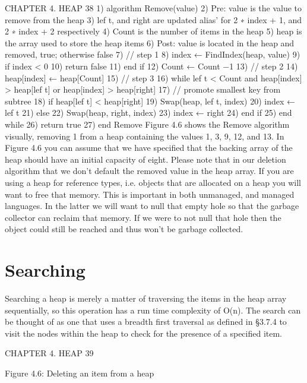 \documentclass{article}
\begin{document}
CHAPTER 4. HEAP 38
1) algorithm Remove(value)
2) Pre: value is the value to remove from the heap
3) lef t, and right are updated alias’ for 2 ∗ index + 1, and 2 ∗ index + 2 respectively
4) Count is the number of items in the heap
5) heap is the array used to store the heap items
6) Post: value is located in the heap and removed, true; otherwise false
7) // step 1
8) index ← FindIndex(heap, value)
9) if index < 0
10) return false
11) end if
12) Count ← Count −1
13) // step 2
14) heap[index] ← heap[Count]
15) // step 3
16) while lef t < Count and heap[index] > heap[lef t] or heap[index] > heap[right]
17) // promote smallest key from subtree
18) if heap[lef t] < heap[right]
19) Swap(heap, lef t, index)
20) index ← lef t
21) else
22) Swap(heap, right, index)
23) index ← right
24) end if
25) end while
26) return true
27) end Remove
Figure 4.6 shows the Remove algorithm visually, removing 1 from a heap
containing the values 1, 3, 9, 12, and 13. In Figure 4.6 you can assume that we
have specified that the backing array of the heap should have an initial capacity
of eight.
Please note that in our deletion algorithm that we don’t default the removed
value in the heap array. If you are using a heap for reference types, i.e. objects
that are allocated on a heap you will want to free that memory. This is important
in both unmanaged, and managed languages. In the latter we will want to null
that empty hole so that the garbage collector can reclaim that memory. If we
were to not null that hole then the object could still be reached and thus won’t be garbage collected.
\section*{Searching}\label{sec:sear}
  
  Searching a heap is merely a matter of traversing the items in the heap array
sequentially, so this operation has a run time complexity of O(n). The search
can be thought of as one that uses a breadth first traversal as defined in §3.7.4
to visit the nodes within the heap to check for the presence of a specified item.

CHAPTER 4. HEAP 39

Figure 4.6: Deleting an item from a heap
\end{document}
